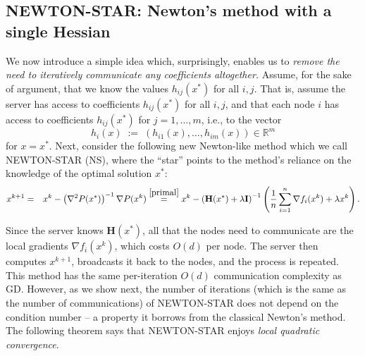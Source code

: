 \documentclass[12pt]{article}
\newcommand{\eqdef}{\; { := }\;}
\newcommand{\R}{\mathbb{R}}
\newcommand{\newalpha}{h}
\newcommand{\mH}{\mathbf{H}}
\newcommand{\mI}{\mathbf{I}}
\begin{document}
\subsection{{\sf NEWTON-STAR}: Newton's method with a single Hessian} \label{subsec:Newton-star}

We now introduce a simple idea which, surprisingly, enables us to {\em remove the need to iteratively communicate any coefficients altogether.}  Assume, for the sake of argument, that we know the values  $\newalpha_{ij}(x^*)$ for all $i,j$. That is, assume the server has access to coefficients $\newalpha_{ij}(x^*)$ for all $i,j$, and that each node $i$ has access to coefficients $\newalpha_{ij}(x^*)$  for $j=1,\dots,m$, i.e., to the vector
\begin{equation}\label{eq:8f0d8hfd}\newalpha_{i}(x) \eqdef (\newalpha_{i1}(x),\dots, \newalpha_{im}(x)) \in \R^m\end{equation}
for $x=x^*$.  Next, consider the following new Newton-like method which we call {\sf NEWTON-STAR (NS)}, where the ``star'' points to the method's reliance on the knowledge of the optimal solution $x^*$:
\begin{eqnarray}  x^{k+1} &=& x^k - \left(\nabla^2 P(x^*) \right)^{-1} \nabla P(x^k) 
\overset{\eqref{primal}}{=} x^k - \left(\mH(x^*) +\lambda \mI \right)^{-1} \left(\frac{1}{n}\sum_{i=1}^n \nabla f_i(x^k) + \lambda x^k\right).\label{eq:Newton-star}\end{eqnarray}

Since the server knows $\mH(x^*)$, all that the nodes need to communicate are the local gradients $\nabla f_i(x^k)$, which costs $O(d)$ per node. The server then computes $x^{k+1}$, broadcasts it back to the nodes, and the process is repeated. This method has the same per-iteration $O(d)$ communication complexity as GD. However, as we show next, the number of iterations (which is the same as the number of communications) of {\sf NEWTON-STAR} does not depend on the condition number -- a property it borrows from the classical Newton's method. The following theorem says that {\sf NEWTON-STAR} enjoys {\em local quadratic convergence}.
\end{document}
